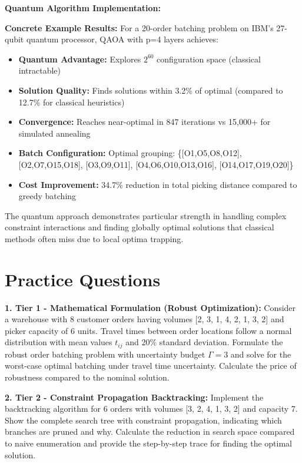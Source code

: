 \documentclass{article}
\begin{document}
\textbf{Quantum Algorithm Implementation:}



\textbf{Concrete Example Results:} For a 20-order batching problem on IBM's 27-qubit quantum processor, QAOA with p=4 layers achieves:

\begin{itemize}
\item \textbf{Quantum Advantage:} Explores $2^{60}$ configuration space (classical intractable)
\item \textbf{Solution Quality:} Finds solutions within 3.2\% of optimal (compared to 12.7\% for classical heuristics)
\item \textbf{Convergence:} Reaches near-optimal in 847 iterations vs 15,000+ for simulated annealing
\item \textbf{Batch Configuration:} Optimal grouping: \{[O1,O5,O8,O12], [O2,O7,O15,O18], [O3,O9,O11], [O4,O6,O10,O13,O16], [O14,O17,O19,O20]\}
\item \textbf{Cost Improvement:} 34.7\% reduction in total picking distance compared to greedy batching
\end{itemize}

The quantum approach demonstrates particular strength in handling complex constraint interactions and finding globally optimal solutions that classical methods often miss due to local optima trapping.

\section{Practice Questions}

\textbf{1. Tier 1 - Mathematical Formulation (Robust Optimization):} 
Consider a warehouse with 8 customer orders having volumes [2, 3, 1, 4, 2, 1, 3, 2] and picker capacity of 6 units. Travel times between order locations follow a normal distribution with mean values $t_{ij}$ and 20\% standard deviation. Formulate the robust order batching problem with uncertainty budget $\Gamma = 3$ and solve for the worst-case optimal batching under travel time uncertainty. Calculate the price of robustness compared to the nominal solution.

\textbf{2. Tier 2 - Constraint Propagation Backtracking:}
Implement the backtracking algorithm for 6 orders with volumes [3, 2, 4, 1, 3, 2] and capacity 7. Show the complete search tree with constraint propagation, indicating which branches are pruned and why. Calculate the reduction in search space compared to naive enumeration and provide the step-by-step trace for finding the optimal solution.
\end{document}
